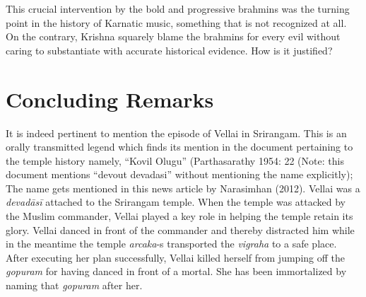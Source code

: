 This crucial intervention by the bold and progressive brahmins was the turning point in the history of Karnatic music, something that is not recognized at all. On the contrary, Krishna squarely blame the brahmins for every evil without caring to substantiate with accurate historical evidence. How is it justified?


\section*{Concluding Remarks}

It is indeed pertinent to mention the episode of Vellai in Srirangam. This is an orally transmitted legend which finds its mention in the document pertaining to the temple history namely, “Kovil Olugu” (Parthasarathy 1954: 22 (Note: this document mentions “devout devadasi” without mentioning the name explicitly); The name gets mentioned in this news article by Narasimhan (2012). Vellai was a \textit{devadāsī} attached to the Srirangam temple. When the temple was attacked by the Muslim commander, Vellai played a key role in helping the temple retain its glory. Vellai danced in front of the commander and thereby distracted him while in the meantime the temple \textit{arcaka}-s transported the \textit{vigraha} to a safe place. After executing her plan successfully, Vellai killed herself from jumping off the \textit{gopuram} for having danced in front of a mortal. She has been immortalized by naming that \textit{gopuram} after her.

